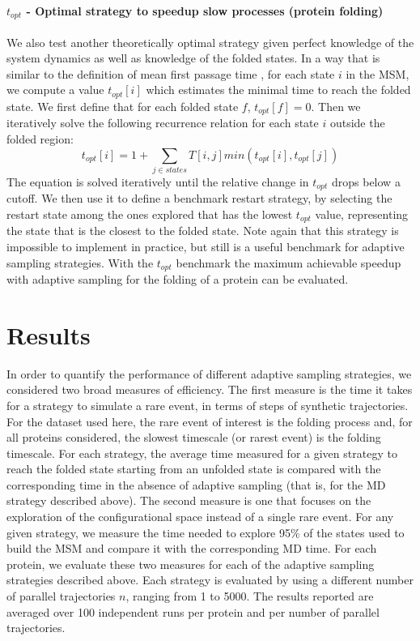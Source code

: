 \paragraph{$t_{opt}$ - Optimal strategy to speedup slow processes (protein folding)} 
We also test another theoretically optimal strategy given perfect knowledge of the
system dynamics as well as knowledge of the folded states. In a way that is
similar to the definition of mean first passage time \cite{mfptbook},
for each state $i$ in the MSM, we compute a value $t_{opt}[i]$ which 
estimates the minimal time to reach the folded state.
We first define that for each folded state $f$, $t_{opt}[f] = 0$. Then we
iteratively solve the following recurrence relation for each state $i$ outside the folded region:
%
$$t_{opt}[i]=1+\sum_{j \in states}T[i,j]min(t_{opt}[i],t_{opt}[j])$$
%
The equation is solved iteratively until the relative change in $t_{opt}$ drops
below a cutoff. We then use it to define a benchmark restart strategy, by
selecting the restart state among the ones explored that has the lowest
$t_{opt}$ value, representing the state that is the closest to the folded
state. Note again that this strategy is impossible to implement in
practice, but still is a useful benchmark for adaptive sampling strategies.
With the $t_{opt}$ benchmark the maximum achievable speedup with adaptive
sampling for the folding of a protein can be evaluated.

\section{\label{sec:results}Results}

In order to quantify the performance of different adaptive sampling strategies,
we considered two broad measures of efficiency. The first measure is the time
it takes for a strategy to simulate a rare event, in terms of steps of synthetic
trajectories. For the dataset used here, the rare event of interest is the
folding process and, for all proteins considered, the slowest timescale (or
rarest event) is the folding timescale. For each strategy, the average time measured
for a given strategy to reach the folded state starting from an unfolded state
is compared with the corresponding time in the absence of adaptive sampling
(that is, for the MD strategy described above). The second measure is one
that focuses on the exploration of the configurational space instead of a single
rare event. For any given strategy, we measure the time needed to explore 95\%
of the states used to build the MSM and compare it with the corresponding MD time.
For each protein, we evaluate these two measures for each of the adaptive
sampling strategies described above. Each strategy is evaluated by using a different
number of parallel trajectories $n$, ranging from 1 to 5000. 
The results reported
are averaged over 100 independent runs per protein and per number of parallel
trajectories.

